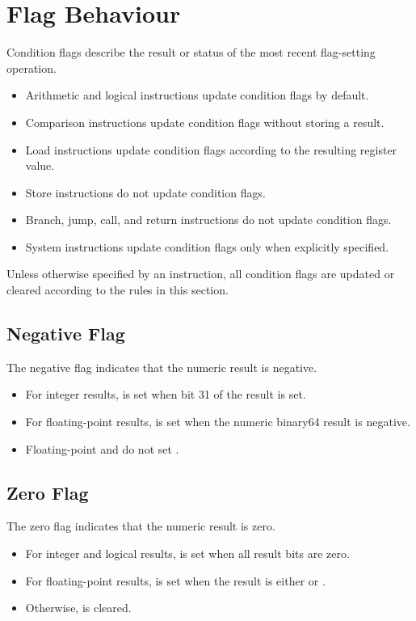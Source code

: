 \section{Flag Behaviour}

Condition flags describe the result or status of the most recent flag-setting
operation.

\begin{itemize}
\item Arithmetic and logical instructions update condition flags by default.
\item Comparison instructions update condition flags without storing a result.
\item Load instructions update condition flags according to the resulting
register value.
\item Store instructions do not update condition flags.
\item Branch, jump, call, and return instructions do not update condition flags.
\item System instructions update condition flags only when explicitly specified.
\end{itemize}

Unless otherwise specified by an instruction, all condition flags are updated
or cleared according to the rules in this section.

\subsection{Negative Flag}

The negative flag  indicates that the numeric result is negative.

\begin{itemize}
\item For integer results,  is set when bit 31 of the result is set.
\item For floating-point results,  is set when the numeric binary64
result is negative.
\item Floating-point  and  do not set .
\end{itemize}

\subsection{Zero Flag}

The zero flag  indicates that the numeric result is zero.

\begin{itemize}
\item For integer and logical results,  is set when all result bits are
zero.
\item For floating-point results,  is set when the result is either
 or .
\item Otherwise,  is cleared.
\end{itemize}

